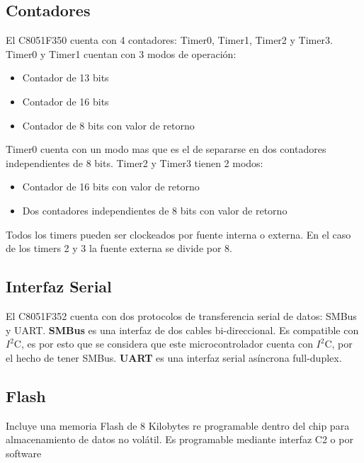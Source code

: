 \subsection{Contadores} %
\label{sub:contadores}

El C8051F350 cuenta con 4 contadores: Timer0, Timer1, Timer2 y Timer3. Timer0 y Timer1 cuentan con 3 modos de operaci\'on:
\begin{itemize}
  \item Contador de 13 bits
  \item Contador de 16 bits
  \item Contador de 8 bits con valor de retorno
\end{itemize}
Timer0 cuenta con un modo mas que es el de separarse en dos contadores independientes de 8 bits.
Timer2 y Timer3 tienen 2 modos:
 \begin{itemize}
   \item Contador de 16 bits con valor de retorno
   \item Dos contadores independientes de 8 bits con valor de retorno
 \end{itemize}

Todos los timers pueden ser clockeados por fuente interna o externa. En el caso de los timers 2 y 3 la fuente externa se divide por 8.

\subsection{Interfaz Serial} %
\label{sub:interfaz_serial}

El C8051F352 cuenta con dos protocolos de transferencia serial de datos: SMBus y UART. \textbf{SMBus} es una interfaz de dos cables bi-direccional. Es compatible con $I^{2}$C, es por esto que se considera que este microcontrolador cuenta con $I^{2}$C, por el hecho de tener SMBus. \textbf{UART} es una interfaz serial as\'incrona full-duplex.

\subsection{Flash} %
\label{sub:flash}

Incluye una memoria Flash de 8 Kilobytes re programable dentro del chip para almacenamiento de datos no vol\'atil. Es programable mediante interfaz C2 o por software
